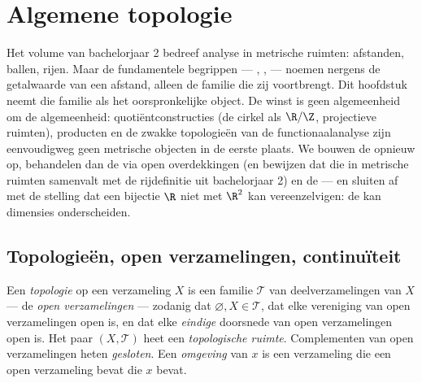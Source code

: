\chapter{Algemene topologie}\label{ch:b3:topology}

Het volume van bachelorjaar 2 bedreef analyse in metrische
ruimten: afstanden, ballen, rijen. Maar de fundamentele begrippen
--- , ,  --- noemen nergens de
getalwaarde van een afstand, alleen de familie \emph{} die zij voortbrengt. Dit hoofdstuk neemt die
familie als het oorspronkelijke object. De winst is geen
algemeenheid om de algemeenheid: quotiëntconstructies (de cirkel
als $\R/\Z$, projectieve ruimten), producten en de zwakke
topologieën van de functionaalanalyse zijn eenvoudigweg geen
metrische objecten in de eerste plaats. We bouwen de 
opnieuw op, behandelen dan de  via open overdekkingen
(en bewijzen dat die in metrische ruimten samenvalt met de
rijdefinitie uit bachelorjaar 2) en de  --- en sluiten af
met de stelling dat een  bijectie $\R$ niet met $\R^2$ kan
vereenzelvigen: de  kan dimensies onderscheiden.

\section{Topologieën, open verzamelingen, continuïteit}

\begin{definition}\label{def:b3:topology:topology}
Een \emph{topologie} op een verzameling $X$ is
een familie $\mathcal T$ van deelverzamelingen van $X$ --- de
\emph{open verzamelingen} --- zodanig dat
$\varnothing, X \in \mathcal T$, dat elke vereniging van open
verzamelingen open is, en dat elke \emph{eindige} doorsnede van
open verzamelingen open is. Het paar $(X, \mathcal T)$ heet een
\emph{topologische ruimte}. Complementen van open verzamelingen
heten \emph{gesloten}. Een \emph{omgeving} van $x$
is een verzameling die een open verzameling bevat die $x$ bevat.
\end{definition}


